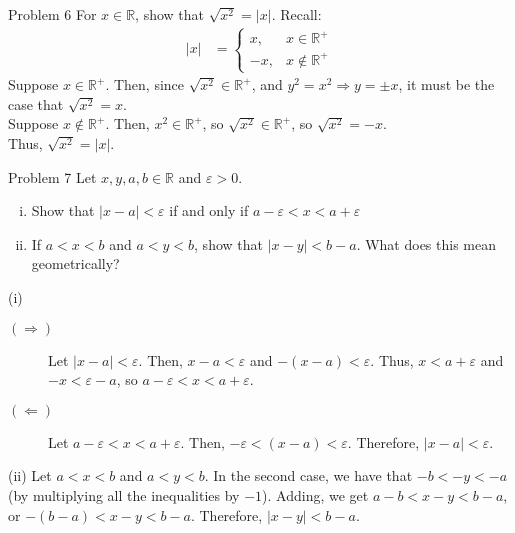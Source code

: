 \documentclass[10pt]{extarticle}
\newcommand{\R}{\mathbb{R}}
\begin{document}
  \begin{problem}{Problem 6}
    For $x\in\R$, show that $\sqrt{x^2} = |x|$.
    \tcblower
    Recall:
    \begin{align*}
      |x| &= \begin{cases}
        x,&x \in \R^+\\
        -x,& x\notin\R^+
      \end{cases}
    \end{align*}
    Suppose $x\in\R^+$. Then, since $\sqrt{x^2}\in\R^+$, and $y^2 = x^2 \Rightarrow y = \pm x$, it must be the case that $\sqrt{x^2} = x$.\\

    Suppose $x\notin\R^+$. Then, $x^2\in\R^+$, so $\sqrt{x^2} \in \R^+$, so $\sqrt{x^2} = -x$.\\

    Thus, $\sqrt{x^2} = |x|$.
  \end{problem}
  \begin{problem}{Problem 7}
    Let $x,y,a,b\in\R$ and $\varepsilon > 0$.
    \begin{enumerate}[(i)]
      \item Show that $|x-a| < \varepsilon$ if and only if $a-\varepsilon < x < a+\varepsilon$
      \item If $a < x < b$ and $a < y < b$, show that $|x-y| < b-a$. What does this mean geometrically?
    \end{enumerate}
    \tcblower
    \begin{problem}{(i)}
      \begin{description}
        \item[$(\Rightarrow)$] Let $|x-a| < \varepsilon$. Then, $x-a < \varepsilon$ and $-(x-a) < \varepsilon$. Thus, $x < a + \varepsilon$ and $-x < \varepsilon - a$, so $a-\varepsilon < x < a+ \varepsilon$.
        \item[$(\Leftarrow)$] Let $a-\varepsilon < x < a+\varepsilon$. Then, $-\varepsilon < (x-a) < \varepsilon$. Therefore, $|x-a| < \varepsilon$.
      \end{description}
    \end{problem}
    \begin{problem}{(ii)}
      Let $a < x < b$ and $a < y < b$. In the second case, we have that $-b < -y < -a$ (by multiplying all the inequalities by $-1$). Adding, we get $a-b < x-y < b-a$, or $-(b-a) < x-y < b-a$. Therefore, $|x-y| < b-a$.
    \end{problem}
  \end{problem}
\end{document}

